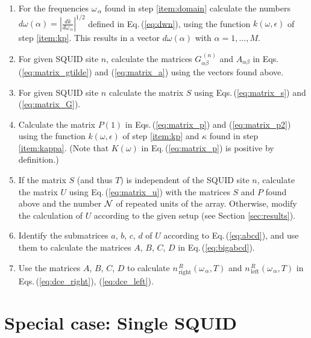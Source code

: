 \begin{enumerate}
\item For the frequencies $\omega_{\,\alpha}$ found in step \ref{item:domain} calculate the numbers
$d\omega(\alpha) = \displaystyle{\left|\frac{dk}{d\omega_{\,\alpha}} \right|^{1/2}}$ defined in Eq.\,(\ref{eq:dwn}), 
using the function $k(\omega,\epsilon)$ of step \ref{item:kp}. 
This results in a vector $d\omega(\alpha)$ with $\alpha = 1, \ldots, M$. 

\item For given SQUID site $n$, calculate the matrices $G_{\alpha \beta}^{\,(n)}$ and $A_{\alpha \beta}$
in Eqs.\,(\ref{eq:matrix_gtilde}) and (\ref{eq:matrix_a}) using the vectors found above.  

\item For given SQUID site $n$ calculate the matrix $S$ using Eqs.\,(\ref{eq:matrix_s}) and (\ref{eq:matrix_G}).  

\item Calculate the matrix $P(1)$ in Eqs.\,(\ref{eq:matrix_p}) and (\ref{eq:matrix_p2})
using the function $k(\omega,\epsilon)$ of step \ref{item:kp} and $\kappa$
found in step \ref{item:kappa}. (Note that $K(\omega)$ in Eq.\,(\ref{eq:matrix_p}) is positive by definition.)

\item If the matrix $S$ (and thus $T$) is independent of the SQUID site $n$, calculate the matrix 
$U$ using Eq.\,(\ref{eq:matrix_u}) with the matrices $S$ and $P$ found above 
and the number ${\cal N}$ of repeated units of the array. Otherwise, modify the calculation of $U$
according to the given setup (see Section \ref{sec:results}). 

\item \label{item:abcd}
Identify the submatrices $a$, $b$, $c$, $d$ of $U$ according to Eq.\,(\ref{eq:abcd}), and use
them to calculate the matrices $A$, $B$, $C$, $D$ in Eq.\,(\ref{eq:bigabcd}). 

\item \label{item:dce}
Use the matrices $A$, $B$, $C$, $D$ to calculate 
$n_{\,\text{right}}^{\,R}(\omega_{\,\alpha}, T)$ and 
$n_{\,\text{left}}^{\,R}(\omega_{\,\alpha}, T)$ 
in Eqs.\,(\ref{eq:dce_right}), (\ref{eq:dce_left}). 

\end{enumerate}


\section{Special case: Single SQUID}
\label{sec:single}


